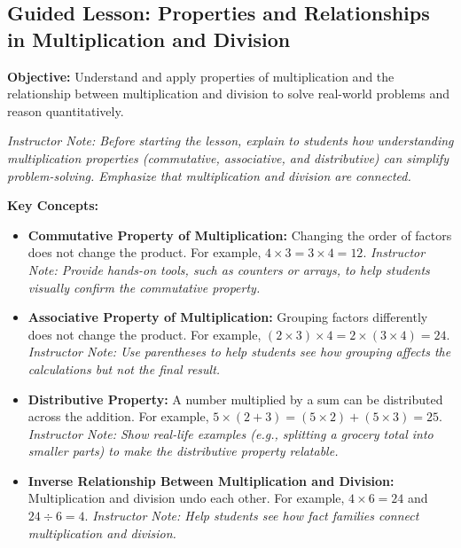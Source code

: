 \documentclass[12pt]{article}
\title{}
\date{}
\begin{document}
\subsection*{Guided Lesson: Properties and Relationships in Multiplication and Division}
\onehalfspacing

\begin{tcolorbox}[colframe=black!40, colback=gray!5, 
coltitle=black, colbacktitle=black!20, fonttitle=\bfseries\Large, 
title=Learning Objective, halign title=center, left=5pt, right=5pt, top=5pt, bottom=15pt]
\textbf{Objective:} Understand and apply properties of multiplication and the relationship between multiplication and division to solve real-world problems and reason quantitatively.
\end{tcolorbox}

{\color{blue} \textit{Instructor Note: Before starting the lesson, explain to students how understanding multiplication properties (commutative, associative, and distributive) can simplify problem-solving. Emphasize that multiplication and division are connected.}}

\vspace{3em}

\begin{tcolorbox}[colframe=black!60, colback=white, 
coltitle=black, colbacktitle=black!15, fonttitle=\bfseries\Large, 
title=Key Concepts and Vocabulary, halign title=center, left=10pt, right=10pt, top=10pt, bottom=15pt]
\textbf{Key Concepts:}
\begin{itemize}
    \item \textbf{Commutative Property of Multiplication:} Changing the order of factors does not change the product. For example, \(4 \times 3 = 3 \times 4 = 12\).
    {\color{blue} \textit{Instructor Note: Provide hands-on tools, such as counters or arrays, to help students visually confirm the commutative property.}}
    \item \textbf{Associative Property of Multiplication:} Grouping factors differently does not change the product. For example, \((2 \times 3) \times 4 = 2 \times (3 \times 4) = 24\).
    {\color{blue} \textit{Instructor Note: Use parentheses to help students see how grouping affects the calculations but not the final result.}}
    \item \textbf{Distributive Property:} A number multiplied by a sum can be distributed across the addition. For example, \(5 \times (2 + 3) = (5 \times 2) + (5 \times 3) = 25\).
    {\color{blue} \textit{Instructor Note: Show real-life examples (e.g., splitting a grocery total into smaller parts) to make the distributive property relatable.}}
    \item \textbf{Inverse Relationship Between Multiplication and Division:} Multiplication and division undo each other. For example, \(4 \times 6 = 24\) and \(24 \div 6 = 4\).
    {\color{blue} \textit{Instructor Note: Help students see how fact families connect multiplication and division.}}
\end{itemize}
\end{tcolorbox}
\end{document}
